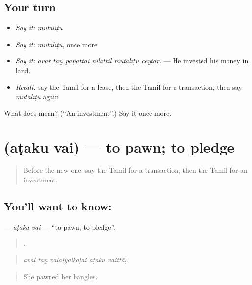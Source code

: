 \subsection*{Your turn}
\begin{itemize}
\raggedright
  \item \emph{Say it:} \emph{mutalīṭu}
  \item \emph{Say it:} \emph{mutalīṭu}, once more
  \item \emph{Say it:} \emph{avar taṉ paṇattai nilattil mutalīṭu ceytār.} — He invested his money in land.
  \item \emph{Recall:} say the Tamil for a lease, then the Tamil for a transaction, then say \emph{mutalīṭu} again
\end{itemize}

\begin{tcolorbox}[breakable,colback=teal!4,colframe=teal!35!black,title={Before you move on}]
What does  mean? (\textquotedblleft{}An investment\textquotedblright{}.) Say it once more.
\end{tcolorbox}
\section[\texorpdfstring{\ta{அடகு} \ta{வை} (aṭaku vai)}{அடகு வை (aṭaku vai)}]{  (aṭaku vai) — to pawn; to pledge}

\label{lesson:TA-C449-ataku-vai}



\begin{quote}
Before the new one: say the Tamil for a transaction, then the Tamil for an investment.
\end{quote}

\subsection*{You'll want to know:  }
\textbf{ } — \emph{aṭaku vai} — \textquotedblleft{}to pawn; to pledge\textquotedblright{}.

\begin{quote}
    .
\end{quote}

\begin{quote}
\emph{avaḷ taṉ vaḷaiyalkaḷai aṭaku vaittāḷ.}
\end{quote}

\begin{quote}
She pawned her bangles.
\end{quote}

